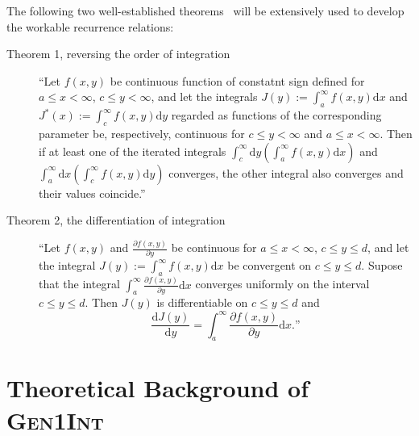 \documentclass[a4paper,11pt,twoside,openright]{book}
\begin{document}
The following two well-established theorems~\cite{Chaudhry:2002} will be extensively used to develop the workable
recurrence relations:
\begin{description}
  \item[Theorem 1, reversing the order of integration] ``Let $f(x,y)$ be continuous function of constatnt sign defined
  for $a\le x<\infty$, $c\le y<\infty$, and let the integrals $J(y):=\int_{a}^{\infty}f(x,y)\mathrm{d}x$ and
  $J^{*}(x):=\int_{c}^{\infty}f(x,y)\mathrm{d}y$ regarded as functions of the corresponding parameter be, respectively,
  continuous for $c\le y<\infty$ and $a\le x<\infty$. Then if at least one of the iterated integrals
  $\int_{c}^{\infty}\mathrm{d}y\left(\int_{a}^{\infty}f(x,y)\mathrm{d}x\right)$ and
  $\int_{a}^{\infty}\mathrm{d}x\left(\int_{c}^{\infty}f(x,y)\mathrm{d}y\right)$ converges, the other integral also converges and
  their values coincide.''
  \item[Theorem 2, the differentiation of integration] ``Let $f(x,y)$ and $\frac{\partial f(x,y)}{\partial y}$ be continuous
  for $a\le x<\infty$, $c\le y\le d$, and let the integral $J(y):=\int_{a}^{\infty}f(x,y)\mathrm{d}x$ be convergent on
  $c\le y\le d$. Supose that the integral $\int_{a}^{\infty}\frac{\partial f(x,y)}{\partial y}\mathrm{d}x$ converges uniformly
  on the interval $c\le y\le d$. Then $J(y)$ is differentiable on $c\le y\le d$ and
  \begin{equation}
    \frac{\mathrm{d}J(y)}{\mathrm{d}y}=\int_{a}^{\infty}\frac{\partial f(x,y)}{\partial y}\mathrm{d}x.\text{''}
  \end{equation}
\end{description}


\section{Theoretical Background of \textsc{Gen1Int}}
\label{sect:theory}
\end{document}
